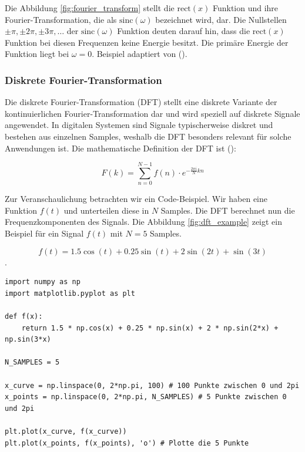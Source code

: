 \documentclass[11pt,a4paper]{article}
\begin{document}
\noindent
Die Abbildung \ref{fig:fourier_transform} stellt die \( \text{rect}(x) \) Funktion und ihre
Fourier-Transformation, die als \( \text{sinc}(\omega) \) bezeichnet wird, dar. Die Nullstellen
\( \pm \pi, \pm 2 \pi, \pm 3 \pi, \dots \) der \( \text{sinc}(\omega) \) Funktion deuten darauf
hin, dass die \( \text{rect}(x) \) Funktion bei diesen Frequenzen keine Energie besitzt. Die
primäre Energie der Funktion liegt bei \( \omega=0 \). Beispiel adaptiert von
(\cite[Chapter~5 - Example~5.1]{hansen2014fourier}).



\subsubsection{Diskrete Fourier-Transformation}

Die diskrete Fourier-Transformation (DFT) stellt eine diskrete Variante der kontinuierlichen
Fourier-Transformation dar und wird speziell auf diskrete Signale angewendet. In digitalen
Systemen sind Signale typischerweise diskret und bestehen aus einzelnen Samples, weshalb die DFT
besonders relevant für solche Anwendungen ist. Die mathematische Definition der DFT ist
(\cite[Chapter~3]{hansen2014fourier}):

\[
	F(k) = \sum_{n=0}^{N-1} f(n) \cdot e^{-\frac{2\pi i}{N} kn}
\]

\noindent
\newline
Zur Veranschaulichung betrachten wir ein Code-Beispiel. Wir haben eine Funktion \(f(t)\) und unterteilen
diese in \(N\) Samples. Die DFT berechnet nun die Frequenzkomponenten des Signals. Die Abbildung
\ref{fig:dft_example} zeigt ein Beispiel für ein Signal \(f(t)\) mit \(N=5\) Samples.

\[ f(t) = 1.5 \cos(t) + 0.25 \sin(t) + 2 \sin(2t) + \sin(3t) \].


\begin{lstlisting}
import numpy as np
import matplotlib.pyplot as plt

def f(x):
    return 1.5 * np.cos(x) + 0.25 * np.sin(x) + 2 * np.sin(2*x) + np.sin(3*x)

N_SAMPLES = 5

x_curve = np.linspace(0, 2*np.pi, 100) # 100 Punkte zwischen 0 und 2pi
x_points = np.linspace(0, 2*np.pi, N_SAMPLES) # 5 Punkte zwischen 0 und 2pi

plt.plot(x_curve, f(x_curve))
plt.plot(x_points, f(x_points), 'o') # Plotte die 5 Punkte
\end{lstlisting}
\end{document}
